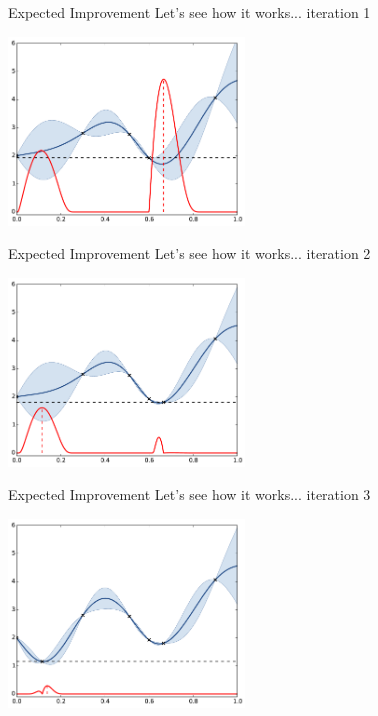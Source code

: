 \documentclass{beamer}
\begin{document}
\begin{frame}{Expected Improvement}
Let's see how it works... iteration 1
\begin{center}
\includegraphics[height=5cm]{figures/python/ego_EI1}
\end{center}
\end{frame}

\begin{frame}[noframenumbering]{Expected Improvement}
Let's see how it works... iteration 2
\begin{center}
\includegraphics[height=5cm]{figures/python/ego_EI2}
\end{center}
\end{frame}

\begin{frame}[noframenumbering]{Expected Improvement}
Let's see how it works... iteration 3
\begin{center}
\includegraphics[height=5cm]{figures/python/ego_EI3}
\end{center}
\end{frame}
\end{document}
